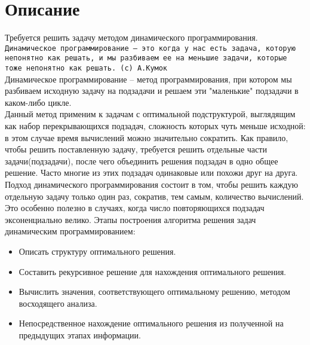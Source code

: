 \section{Описание}
Требуется решить задачу методом динамического программирования. \\
\texttt{Динамическое программирование — это когда у нас есть задача, которую непонятно как решать, и мы разбиваем ее на меньшие задачи, которые тоже непонятно как решать. (с) А.Кумок} \cite{neerc_ifmo}
\\
Динамическое программирование -- метод программирования, при котором мы разбиваем исходную задачу на подзадачи и решаем эти "маленькие" подзадачи в каком-либо цикле.
\\
Данный метод применим к задачам с оптимальной подструктурой, выглядящим как набор перекрывающихся
подзадач, сложность которых чуть меньше исходной: в этом случае время вычислений можно значительно сократить.
Как правило, чтобы решить поставленную задачу, требуется решить отдельные части задачи(подзадачи), после чего объединить
решения подзадач в одно общее решение. Часто многие из этих подзадач одинаковые или похожи друг на друга.
Подход динамического программирования состоит в том, чтобы решить каждую отдельную задачу только один раз,
сократив, тем самым, количество вычислений. Это особенно полезно в случаях, когда число повторяющихся подзадач эксоненциально велико.
Этапы построения алгоритма решения задач динамическим программированием:
\begin{itemize}
	\item Описать структуру оптимального решения.
	\item Составить рекурсивное решение для нахождения оптимального решения.
	\item Вычислить значения, соответствующего оптимальному решению, методом восходящего анализа.
	\item Непосредственное нахождение оптимального решения из полученной на предыдущих этапах информации.
\end{itemize}

\pagebreak

